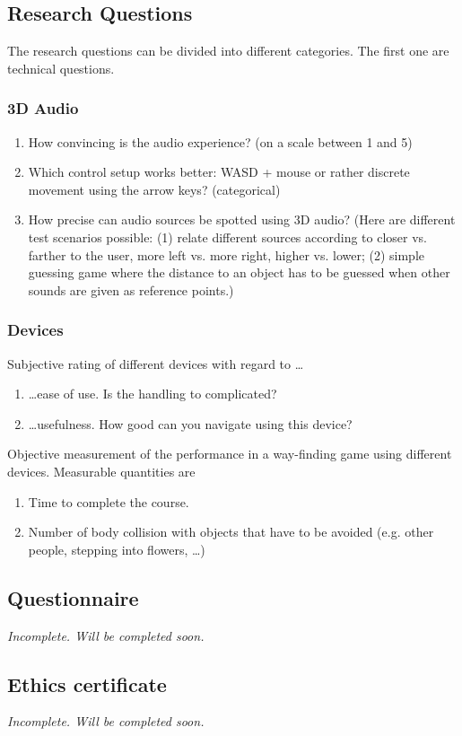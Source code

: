 \documentclass{article}
\begin{document}
\subsection{Research Questions}

The research questions can be divided into different categories. The first one
are technical questions.

\subsubsection{3D Audio}

\begin{enumerate}
  \item How convincing is the audio experience? (on a scale between 1 and 5)
  \item Which control setup works better: WASD + mouse or rather discrete
  movement using the arrow keys? (categorical)
  \item How precise can audio sources be spotted using 3D audio? (Here are
  different test scenarios possible: (1) relate different sources according to
  closer vs. farther to the user, more left vs. more right, higher vs. lower;
  (2) simple guessing game where the distance to an object has to be guessed
  when other sounds are given as reference points.)
\end{enumerate}

\subsubsection{Devices}

Subjective rating of different devices with regard to \ldots
\begin{enumerate}
  \item \ldots ease of use. Is the handling to complicated?
  \item \ldots usefulness. How good can you navigate using this device?
\end{enumerate}

Objective measurement of the performance in a way-finding game using different
devices. Measurable quantities are
\begin{enumerate}
  \item Time to complete the course.
  \item Number of body collision with objects that have to be avoided (e.g.
  other people, stepping into flowers, \ldots)
\end{enumerate} 

\subsection{Questionnaire}

\emph{Incomplete. Will be completed soon.}

\subsection{Ethics certificate}

\emph{Incomplete. Will be completed soon.}



\end{document}

